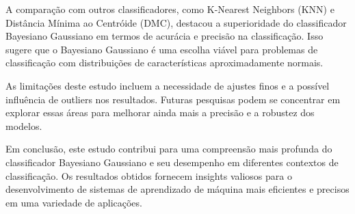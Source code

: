 \documentclass[12pt, a4paper]{report}
\begin{document}
A comparação com outros classificadores, como K-Nearest Neighbors (KNN) e Distância Mínima ao Centróide (DMC), destacou a superioridade do classificador Bayesiano Gaussiano em termos de acurácia e precisão na classificação. Isso sugere que o Bayesiano Gaussiano é uma escolha viável para problemas de classificação com distribuições de características aproximadamente normais.

As limitações deste estudo incluem a necessidade de ajustes finos e a possível influência de outliers nos resultados. Futuras pesquisas podem se concentrar em explorar essas áreas para melhorar ainda mais a precisão e a robustez dos modelos.

Em conclusão, este estudo contribui para uma compreensão mais profunda do classificador Bayesiano Gaussiano e seu desempenho em diferentes contextos de classificação. Os resultados obtidos fornecem insights valiosos para o desenvolvimento de sistemas de aprendizado de máquina mais eficientes e precisos em uma variedade de aplicações.




\end{document}
